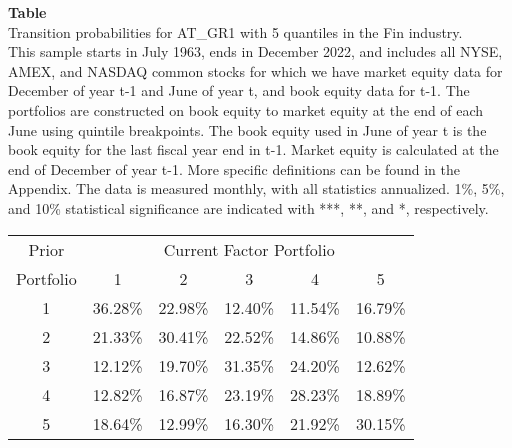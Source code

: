 \begin{table*}[ht!]
\raggedright
{}
\label{tab: transition_probs_AT_GR1_Fin_with_5_quantiles}
\textbf{Table \thetable} \\
Transition probabilities for AT_GR1 with 5 quantiles in the Fin industry. \\
\hspace*{1em}This sample starts in July 1963, ends in December 2022, and includes all NYSE, AMEX, and NASDAQ common stocks for which we have market equity data for December of year t-1 and June of year t, and book equity data for t-1. The portfolios are constructed on book equity to market equity at the end of each June using quintile breakpoints.  The book equity used in June of year t is the book equity for the last fiscal year end in t-1.  Market equity is calculated at the end of December of year t-1.  More specific definitions can be found in the Appendix.  The data is measured monthly, with all statistics annualized.  1\%, 5\%, and 10\% statistical significance are indicated with ***, **, and *, respectively. \\
\vspace{0.5em}
\centering
\begin{adjustbox}{max width=\textwidth}
\begin{tabular}{@{}cccccc@{}}
\toprule
Prior & \multicolumn{5}{c}{Current Factor Portfolio} \\
Portfolio & 1 & 2 & 3 & 4 & 5 \\
\midrule
1 & 36.28\% & 22.98\% & 12.40\% & 11.54\% & 16.79\% \\
2 & 21.33\% & 30.41\% & 22.52\% & 14.86\% & 10.88\% \\
3 & 12.12\% & 19.70\% & 31.35\% & 24.20\% & 12.62\% \\
4 & 12.82\% & 16.87\% & 23.19\% & 28.23\% & 18.89\% \\
5 & 18.64\% & 12.99\% & 16.30\% & 21.92\% & 30.15\% \\
\bottomrule
\end{tabular}
\end{adjustbox}
\end{table*}